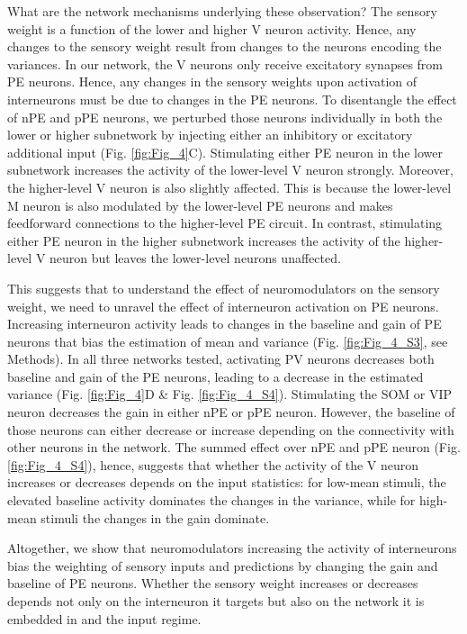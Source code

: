 \documentclass[10pt,a4paper,draft]{article}
\begin{document}
What are the network mechanisms underlying these observation? The sensory weight is a function of the lower and higher V neuron activity. Hence, any changes to the sensory weight result from changes to the neurons encoding the variances. In our network, the V neurons only receive excitatory synapses from PE neurons. Hence, any changes in the sensory weights upon activation of interneurons must be due to changes in the PE neurons. To disentangle the effect of nPE and pPE neurons, we perturbed those neurons individually in both the lower or higher subnetwork by injecting either an inhibitory or excitatory additional input (Fig. \ref{fig:Fig_4}C).
Stimulating either PE neuron in the lower subnetwork increases the activity of the lower-level V neuron strongly. Moreover, the higher-level V neuron is also slightly affected. This is because the lower-level M neuron is also modulated by the lower-level PE neurons and makes feedforward connections to the higher-level PE circuit. In contrast, stimulating either PE neuron in the higher subnetwork increases the activity of the higher-level V neuron but leaves the lower-level neurons unaffected. 

This suggests that to understand the effect of neuromodulators on the sensory weight, we need to unravel the effect of interneuron activation on PE neurons. Increasing interneuron activity leads to changes in the baseline and gain of PE neurons that bias the estimation of mean and variance (Fig. \ref{fig:Fig_4_S3}, see Methods). In all three networks tested, activating PV neurons decreases both baseline and gain of the PE neurons, leading to a decrease in the estimated variance (Fig. \ref{fig:Fig_4}D \& Fig. \ref{fig:Fig_4_S4}). Stimulating the SOM or VIP neuron decreases the gain in either nPE or pPE neuron. However, the baseline of those neurons can either decrease or increase depending on the connectivity with other neurons in the network. The summed effect over nPE and pPE neuron (Fig. \ref{fig:Fig_4_S4}), hence, suggests that whether the activity of the V neuron increases or decreases depends on the input statistics: for low-mean stimuli, the elevated baseline activity dominates the changes in the variance, while for high-mean stimuli the changes in the gain dominate.

Altogether, we show that neuromodulators increasing the activity of interneurons bias the weighting of sensory inputs and predictions by changing the gain and baseline of PE neurons. Whether the sensory weight increases or decreases depends not only on the interneuron it targets but also on the network it is embedded in and the input regime.
\end{document}
